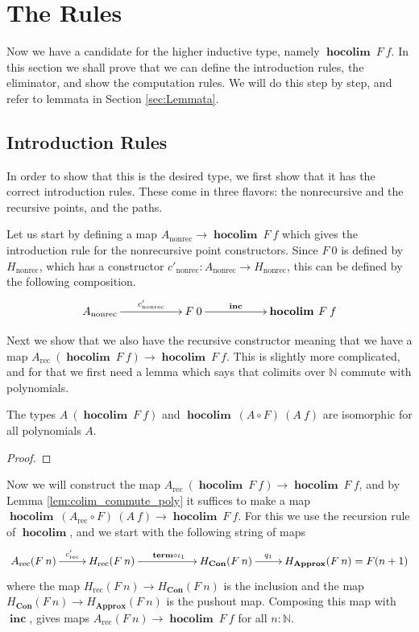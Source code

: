 \documentclass[a4paper,UKenglish]{lipics-v2016}
\newcommand{\rec}[0]{\operatorname{rec}}
\newcommand{\nonrec}[0]{\operatorname{nonrec}}
\newcommand{\term}[0]{\textbf{term}}
\newcommand{\Con}[0]{\textbf{Con}}
\newcommand{\Approx}[0]{\textbf{Approx}}
\newcommand{\hocolim}[0]{\operatorname{\textbf{hocolim}}}
\newcommand{\inc}[0]{\operatorname{\textbf{inc}}}
\begin{document}
\section{The Rules}
\label{sec:rules}
Now we have a candidate for the higher inductive type, namely $\hocolim \> F \> f$.
In this section we shall prove that we can define the introduction rules, the eliminator, and show the computation rules.
We will do this step by step, and refer to lemmata in Section \ref{sec:Lemmata}.

\subsection{Introduction Rules}
In order to show that this is the desired type, we first show that it has the correct introduction rules.
These come in three flavors: the nonrecursive and the recursive points, and the paths.

Let us start by defining a map $A_{\nonrec} \rightarrow \hocolim \> F \> f$ which gives the introduction rule for the nonrecursive point constructors.
Since $F \> 0$ is defined by $H_{\nonrec}$, which has a constructor $c'_{\nonrec} : A_{\nonrec} \rightarrow H_{\nonrec}$, this can be defined by the following composition.
\[
\xymatrix
{
	A_{\nonrec} \ar[rr]^-{c'_{\nonrec}}
		& & F \> 0 \ar[rr]^-{\inc}
		& & \hocolim \> F \> f
}
\]

Next we show that we also have the recursive constructor meaning that we have a map $A_{\rec} \> (\hocolim \> F \> f) \rightarrow \hocolim \> F \> f$.
This is slightly more complicated, and for that we first need a lemma which says that colimits over $\mathbb{N}$ commute with polynomials.

\begin{lemma}
\label{lem:colim_commute_poly}
The types $A \> (\hocolim \> F \> f)$ and $\hocolim \> (A \circ F) \> (A \> f)$ are isomorphic for all polynomials $A$.
\end{lemma}

\begin{proof}

\end{proof}

Now we will construct the map $A_{\rec} \> (\hocolim \> F \> f) \rightarrow \hocolim \> F \> f$, and by Lemma \ref{lem:colim_commute_poly} it suffices to make a map $\hocolim \> (A_{\rec} \circ F) \> (A \> f) \rightarrow \hocolim \> F \> f$.
For this we use the recursion rule of $\hocolim$, and we start with the following string of maps
\[
\xymatrix
{
		A_{\rec}(F \> n) \ar[r]^-{c_{\rec}'} 
		& H_{\rec}(F \> n) \ar[rr]^{\term \circ \iota_1} &
		& H_{\Con}(F \> n) \ar[r]^-{q_1}
		& H_{\Approx}(F \> n) = F(n + 1)
}
\]
where the map $H_{\rec}(F \> n) \rightarrow H_{\Con}(F \> n)$ is the inclusion and the map $H_{\Con}(F \> n) \rightarrow H_{\Approx}(F \> n)$ is the pushout map.
Composing this map with $\inc$, gives maps $A_{\rec}(F \> n) \rightarrow \hocolim \> F \> f$ for all $n : \mathbb{N}$.
\end{document}
